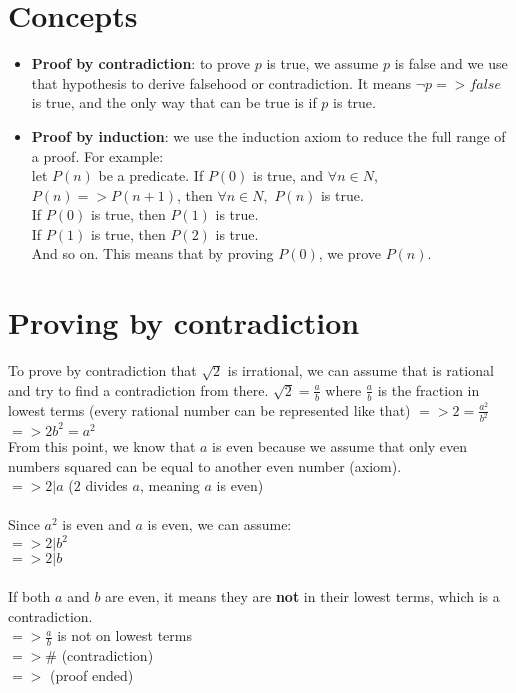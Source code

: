 \documentclass{article}
\begin{document}
	\section{Concepts}
	\begin{itemize}
		\item \textbf{Proof by contradiction}: to prove $p$ is true, we assume $p$ is false and we use that hypothesis to derive falsehood or contradiction. It means $\neg p => false$ is true, and the only way that can be true is if $p$ is true.
		
		\item \textbf{Proof by induction}: we use the induction axiom to reduce the full range of a proof. For example:\\
		let $P(n)$ be a predicate. If $P(0)$ is true, and $\forall n \in N$, $P(n) => P(n + 1)$, then $\forall n \in N,$ $P(n)$ is true.\\
		If $P(0)$ is true, then $P(1)$ is true.\\
		If $P(1)$ is true, then $P(2)$ is true.\\
		And so on. This means that by proving $P(0)$, we prove $P(n)$.
	\end{itemize}
	\section{Proving by contradiction}
	To prove by contradiction that $\sqrt{2}$ is irrational, we can assume that is rational and try to find a contradiction from there.\newline
	\indent$\sqrt{2} = \frac{a}{b}$ where $\frac{a}{b}$ is the fraction in lowest terms (every rational number can be represented like that)\newline
	\indent$=> 2 = \frac{a^2}{b^2}$\newline
	\indent$=> 2b^2 = a^2$\newline\\
	From this point, we know that $a$ is even because we assume that only even numbers squared can be equal to another even number (axiom).\\
	\indent$=> 2 | a$ ($2$ divides $a$, meaning $a$ is even)\\\\
	Since $a^2$ is even and $a$ is even, we can assume:\\
	\indent$=> 2 | b^2$\\
	\indent$=> 2 | b$\\\\
	If both $a$ and $b$ are even, it means they are \textbf{not} in their lowest terms, which is a contradiction.\\
	\indent $=> \frac{a}{b}$ is not on lowest terms\\
	\indent $=> \#$ (contradiction)\\
	\indent $=> $ (proof ended)\\
	
\end{document}
